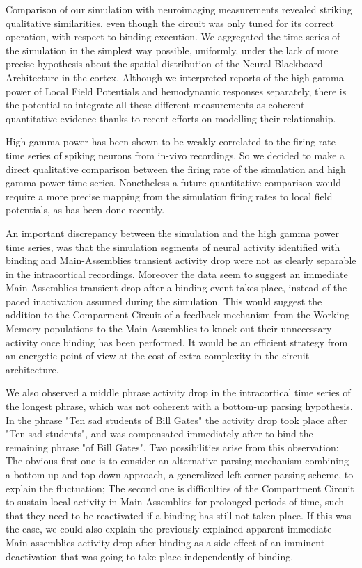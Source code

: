 \documentclass[10pt]{article}
\begin{document}
Comparison of our simulation with neuroimaging measurements revealed striking qualitative similarities, even though the circuit was only tuned for its correct operation, with respect to binding execution.
We aggregated the time series of the simulation in the simplest way possible, uniformly, under the lack of more precise hypothesis about the spatial distribution of the Neural Blackboard Architecture in the cortex.
Although we interpreted reports of the high gamma power of Local Field Potentials and hemodynamic responses separately, there is the potential to integrate all these different measurements as coherent quantitative evidence thanks to recent efforts on modelling their relationship\cite{hermes2017neuronal}.

High gamma power has been shown to be weakly correlated to the firing rate time series of spiking neurons from in-vivo recordings\cite{Ray_2011}.
So we decided to make a direct qualitative comparison between the firing rate of the simulation and high gamma power time series.
Nonetheless a future quantitative comparison would require a more precise mapping from the simulation firing rates to local field potentials, as has been done recently\cite{Mazzoni_2015,Hagen_2015}.

An important discrepancy between the simulation and the high gamma power time series, was that the simulation segments of neural activity identified with binding and Main-Assemblies transient activity drop were not as clearly separable in the intracortical recordings.
Moreover the data seem to suggest an immediate Main-Assemblies transient drop after a binding event takes place, instead of the paced inactivation assumed during the simulation.
This would suggest the addition to the Comparment Circuit of a feedback mechanism from the Working Memory populations to the Main-Assemblies to knock out their unnecessary activity once binding has been performed.
It would be an efficient strategy from an energetic point of view at the cost of extra complexity in the circuit architecture.

We also observed a middle phrase activity drop in the intracortical time series of the longest phrase, which was not coherent with a bottom-up parsing hypothesis. In the phrase "Ten sad students of Bill Gates" the activity drop took place after "Ten sad students", and was compensated immediately after to bind the remaining phrase "of Bill Gates".
Two possibilities arise from this observation:
The obvious first one is to consider an alternative parsing mechanism combining a bottom-up and top-down approach, a generalized left corner parsing scheme, to explain the fluctuation;
The second one is difficulties of the Compartment Circuit to sustain local activity in Main-Assemblies for prolonged periods of time, such that they need to be reactivated if a binding has still not taken place.
If this was the case, we could also explain the previously explained apparent immediate Main-assemblies activity drop after binding as a side effect of an imminent deactivation that was going to take place independently of binding.
\end{document}
